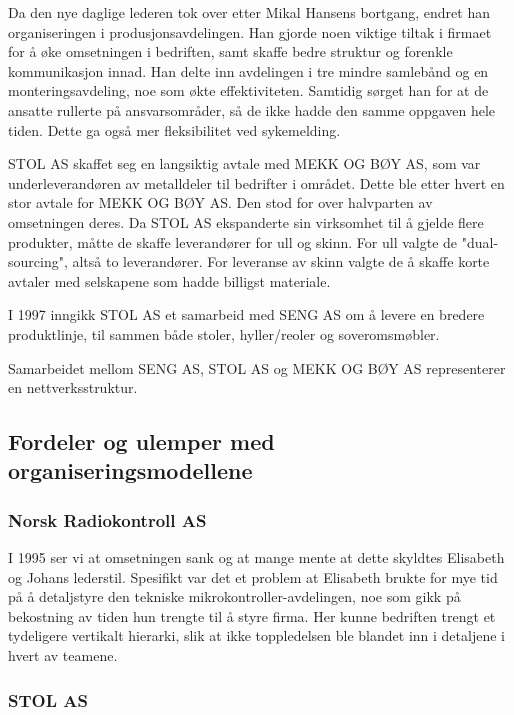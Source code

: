 Da den nye daglige lederen tok over etter Mikal Hansens bortgang, endret han organiseringen i produsjonsavdelingen.
Han gjorde noen viktige tiltak i firmaet for å øke omsetningen i bedriften, samt skaffe bedre struktur og forenkle kommunikasjon innad.
Han delte inn avdelingen i tre mindre samlebånd og en monteringsavdeling, noe som økte effektiviteten. Samtidig sørget han for at de ansatte rullerte på ansvarsområder, så de ikke hadde den samme oppgaven hele tiden. Dette ga også mer fleksibilitet ved sykemelding.

STOL AS skaffet seg en langsiktig avtale med MEKK OG BØY AS, som var underleverandøren av metalldeler til bedrifter i området. Dette ble etter hvert en stor avtale for MEKK OG BØY AS. Den stod for over halvparten av omsetningen deres. Da STOL AS ekspanderte sin virksomhet til å gjelde flere produkter, måtte de skaffe leverandører for ull og skinn. For ull valgte de "dual-sourcing", altså to leverandører. For leveranse av skinn valgte de å skaffe korte avtaler med selskapene som hadde billigst materiale.

I 1997 inngikk STOL AS et samarbeid med SENG AS om å levere en bredere produktlinje, til sammen både stoler, hyller/reoler og soveromsmøbler.

Samarbeidet mellom SENG AS, STOL AS og MEKK OG BØY AS representerer en nettverksstruktur.

\subsection{Fordeler og ulemper med organiseringsmodellene}

\subsubsection{Norsk Radiokontroll AS}

I 1995 ser vi at omsetningen sank og at mange mente at dette skyldtes Elisabeth og Johans lederstil.
Spesifikt var det et problem at Elisabeth brukte for mye tid på å detaljstyre den tekniske mikrokontroller-avdelingen, noe som gikk på bekostning av tiden hun trengte til å styre firma.
Her kunne bedriften trengt et tydeligere vertikalt hierarki, slik at ikke toppledelsen ble blandet inn i detaljene i hvert av teamene.

\subsubsection{STOL AS}

